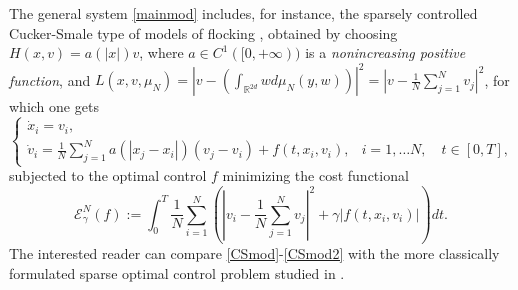 \documentclass[11pt]{article}
\theoremstyle{plain}
\theoremstyle{definition}
\theoremstyle{remark}
\numberwithin{equation}{section}
\begin{document}
The general system \eqref{mainmod} includes, for instance, the sparsely controlled Cucker-Smale type of models of flocking \cite{CFPT}, obtained by choosing $H(x,v) = a(|x|) v$, where $a \in C^{1}([0,+\infty))$ is a {\it nonincreasing positive function},
and $L(x,v,\mu_N) = |v - ( \int_{\mathbb R^{2d}} w d\mu_N(y,w) ) |^2 = | v - \frac{1}{N} \sum_{j=1}^N v_j|^2$, for which one gets
\begin{equation}\label{CSmod}
\left \{
\begin{array}{ll}
\dot x_i = v_i, & \\
\dot v_i =  \frac{1}{N} \sum_{j=1}^N a(|x_j-x_i|) ( v_j - v_i) + f(t,x_i, v_i), & i=1,\dots N, \quad t \in [0,T],
\end{array}
\right.
\end{equation}
subjected to the optimal control $f$ minimizing the cost functional
\begin{equation}\label{CSmod2}
\mathcal E_\gamma^N(f) := \int_{0}^T \frac{1}{N} \sum_{i=1}^N \left (\left |v_i  - \frac{1}{N} \sum_{j=1}^N v_j \right |^2    + \gamma | f(t,x_i,v_i) | \right ) dt.
\end{equation}
The interested reader can compare \eqref{CSmod}-\eqref{CSmod2} with the more classically formulated sparse optimal control problem studied in \cite[Section 5]{CFPT}.
\\
\end{document}

